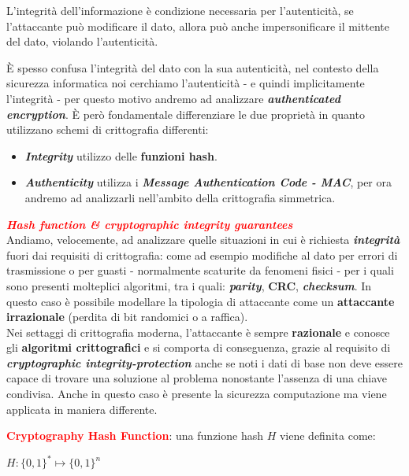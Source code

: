 \begin{flushleft}
    L'integrità dell'informazione è condizione necessaria per l'autenticità, se l'attaccante può modificare il dato, allora può anche impersonificare il mittente del dato, violando l'autenticità.

    \smallskip

    È spesso confusa l'integrità del dato con la sua autenticità, nel contesto della sicurezza informatica noi cerchiamo l'autenticità - e quindi implicitamente l'integrità - per questo motivo andremo ad analizzare \textbf{\textit{authenticated encryption}}. È però fondamentale differenziare le due proprietà in quanto utilizzano schemi di crittografia differenti:
    \begin{itemize}[nosep]
        \item \textbf{\textit{Integrity}} utilizzo delle \textbf{funzioni hash}.
        \item \textbf{\textit{Authenticity}} utilizza i \textbf{\textit{Message Authentication Code - MAC}}, per ora andremo ad analizzarli nell'ambito della crittografia simmetrica.
    \end{itemize}

    \textcolor{red}{\textbf{\textit{Hash function \& cryptographic integrity guarantees}}} \\
    Andiamo, velocemente, ad analizzare quelle situazioni in cui è richiesta \textbf{\textit{integrità}} fuori dai requisiti di crittografia: come ad esempio modifiche al dato per errori di trasmissione o per guasti - normalmente scaturite da fenomeni fisici - per i quali sono presenti molteplici algoritmi, tra i quali: \textbf{\textit{parity}}, \textbf{CRC}, \textbf{\textit{checksum}}. In questo caso è possibile modellare la tipologia di attaccante come un \textbf{attaccante irrazionale} (perdita di bit randomici o a raffica). \\
    Nei settaggi di crittografia moderna, l'attaccante è sempre \textbf{razionale} e conosce gli \textbf{algoritmi crittografici} e si comporta di conseguenza, grazie al requisito di \textbf{\textit{cryptographic integrity-protection}} anche se noti i dati di base non deve essere capace di trovare una soluzione al problema nonostante l'assenza di una chiave condivisa. Anche in questo caso è presente la sicurezza computazione ma viene applicata in maniera differente.

    \medskip

    \textcolor{red}{\textbf{Cryptography Hash Function}}: una funzione hash $H$ viene definita come: 

    {\centering
        $H : \{0, 1\}^* \mapsto \{0, 1\}^n$
    \par}


\end{flushleft}

